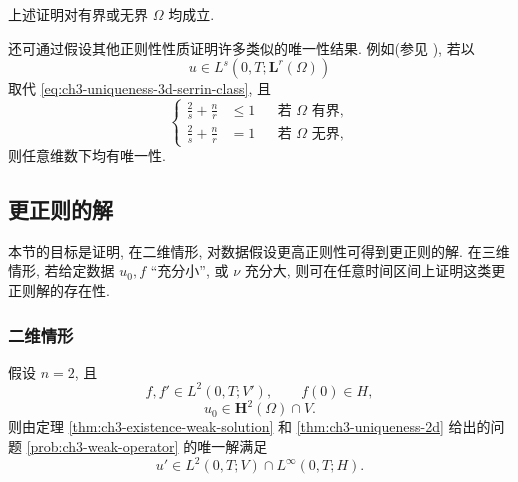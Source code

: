 \begin{Remark}
\label{rem:ch3-uniqueness-3d-unbounded}
上述证明对有界或无界 $\Omega$ 均成立.
\end{Remark}

\begin{Remark}
\label{rem:ch3-uniqueness-serrin-general}
还可通过假设其他正则性性质证明许多类似的唯一性结果. 例如(参见 ), 若以
\begin{equation}
u\in L^s(0,T;\mathbf L^r(\Omega))
\label{eq:ch3-uniqueness-general-serrin-class}
\end{equation}
取代 \eqref{eq:ch3-uniqueness-3d-serrin-class}, 且
\begin{equation}
\left\{
\begin{aligned}
\frac2s+\frac nr&\leq1&&\text{若 }\Omega\text{ 有界},\\
\frac2s+\frac nr&=1&&\text{若 }\Omega\text{ 无界},
\end{aligned}
\right.
\label{eq:ch3-uniqueness-general-serrin-condition}
\end{equation}
则任意维数下均有唯一性.
\end{Remark}

\hypertarget{chapter-03-subsection-3-5-start}{}
\subsection{更正则的解}
\label{subsec:ch3-more-regular-solutions}
本节的目标是证明, 在二维情形, 对数据假设更高正则性可得到更正则的解. 在三维情形, 若给定数据 $u_0,f$ “充分小”, 或 $\nu$ 充分大, 则可在任意时间区间上证明这类更正则解的存在性.

\subsubsection{二维情形}
\label{subsubsec:ch3-more-regular-2d}

\begin{Theorem}
\label{thm:ch3-more-regular-2d}
假设 $n=2$, 且
\begin{equation}
f,f'\in L^2(0,T;V'),
\qquad f(0)\in H,
\label{eq:ch3-regular-2d-force-assumptions}
\end{equation}
\begin{equation}
u_0\in\mathbf H^2(\Omega)\cap V.
\label{eq:ch3-regular-2d-initial-assumption}
\end{equation}
则由定理 \ref{thm:ch3-existence-weak-solution} 和 \ref{thm:ch3-uniqueness-2d} 给出的问题 \ref{prob:ch3-weak-operator} 的唯一解满足
\begin{equation}
u'\in L^2(0,T;V)\cap L^\infty(0,T;H).
\label{eq:ch3-regular-2d-time-regularity}
\end{equation}
\end{Theorem}


